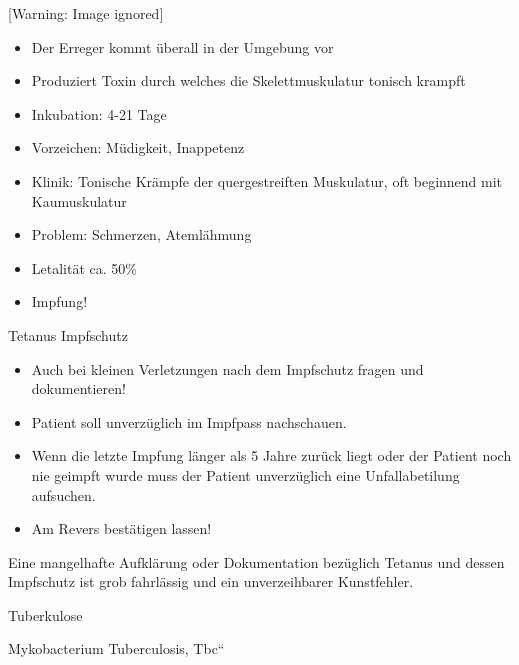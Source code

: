\documentclass{article}
\begin{document}
\begin{center}
 [Warning: Image ignored] %

\end{center}
\begin{itemize}
\item Der Erreger kommt \"uberall in der Umgebung vor

\item Produziert Toxin durch welches die Skelettmuskulatur tonisch
krampft

\item Inkubation: 4-21 Tage

\item Vorzeichen: M\"udigkeit, Inappetenz

\item Klinik: Tonische Kr\"ampfe der quergestreiften Muskulatur, oft
beginnend mit Kaumuskulatur

\item Problem: Schmerzen, Ateml\"ahmung

\item Letalit\"at ca. 50\%

\item Impfung!

\end{itemize}
Tetanus Impfschutz

\begin{itemize}
\item Auch bei kleinen Verletzungen nach dem Impfschutz fragen und
dokumentieren!

\item Patient soll unverz\"uglich im Impfpass nachschauen.

\item Wenn die letzte Impfung l\"anger als 5 Jahre zur\"uck liegt oder
der Patient noch nie geimpft wurde muss der Patient unverz\"uglich eine
Unfallabetilung aufsuchen. 

\item Am Revers best\"atigen lassen!

\end{itemize}
Eine mangelhafte Aufkl\"arung oder Dokumentation bez\"uglich Tetanus und
dessen Impfschutz ist grob fahrl\"assig und ein unverzeihbarer
Kunstfehler.

Tuberkulose 

Mykobacterium Tuberculosis, {\quotedblbase}Tbc{\textquotedblleft}
\end{document}
